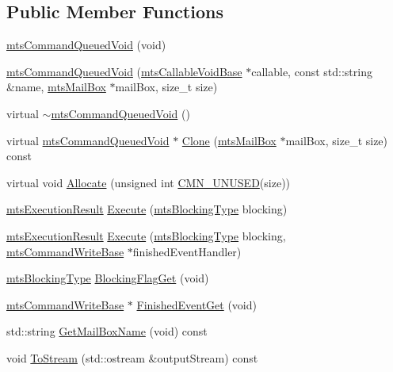 \subsection*{Public Member Functions}
\begin{DoxyCompactItemize}
\item 
\hyperlink{classmts_command_queued_void_ae4b533b50c449cae2635e9a03f311e48}{mts\+Command\+Queued\+Void} (void)
\item 
\hyperlink{classmts_command_queued_void_affae2e472d01c8042d73af7e8b625f09}{mts\+Command\+Queued\+Void} (\hyperlink{classmts_callable_void_base}{mts\+Callable\+Void\+Base} $\ast$callable, const std\+::string \&name, \hyperlink{classmts_mail_box}{mts\+Mail\+Box} $\ast$mail\+Box, size\+\_\+t size)
\item 
virtual \hyperlink{classmts_command_queued_void_ae7df3dadda5dfe5f8451df3f876e2bed}{$\sim$mts\+Command\+Queued\+Void} ()
\item 
virtual \hyperlink{classmts_command_queued_void}{mts\+Command\+Queued\+Void} $\ast$ \hyperlink{classmts_command_queued_void_ac05543187c0ece13fee129e78a3db5c3}{Clone} (\hyperlink{classmts_mail_box}{mts\+Mail\+Box} $\ast$mail\+Box, size\+\_\+t size) const 
\item 
virtual void \hyperlink{classmts_command_queued_void_a78454afe56333b6e5bb2e9c07510bc67}{Allocate} (unsigned int \hyperlink{cmn_portability_8h_a021894e2626935fa2305434b1e893ff6}{C\+M\+N\+\_\+\+U\+N\+U\+S\+E\+D}(size))
\item 
\hyperlink{classmts_execution_result}{mts\+Execution\+Result} \hyperlink{classmts_command_queued_void_ac3d3b8518799820922ccfa207ecd7ab1}{Execute} (\hyperlink{mts_forward_declarations_8h_ad7426ccb6c883bc780d0ee197dddcbe7}{mts\+Blocking\+Type} blocking)
\item 
\hyperlink{classmts_execution_result}{mts\+Execution\+Result} \hyperlink{classmts_command_queued_void_a116aafff54b04cf64c0cc5613b3af268}{Execute} (\hyperlink{mts_forward_declarations_8h_ad7426ccb6c883bc780d0ee197dddcbe7}{mts\+Blocking\+Type} blocking, \hyperlink{classmts_command_write_base}{mts\+Command\+Write\+Base} $\ast$finished\+Event\+Handler)
\item 
\hyperlink{mts_forward_declarations_8h_ad7426ccb6c883bc780d0ee197dddcbe7}{mts\+Blocking\+Type} \hyperlink{classmts_command_queued_void_a163d660aee89584416b7d30fb171a388}{Blocking\+Flag\+Get} (void)
\item 
\hyperlink{classmts_command_write_base}{mts\+Command\+Write\+Base} $\ast$ \hyperlink{classmts_command_queued_void_ae1854cdc3b5616be70f882958a0d05de}{Finished\+Event\+Get} (void)
\item 
std\+::string \hyperlink{classmts_command_queued_void_af4cee03f759bbaece836a573fb1772c2}{Get\+Mail\+Box\+Name} (void) const 
\item 
void \hyperlink{classmts_command_queued_void_ab5d265a6803f5d3c6d540bf3c4c2fd36}{To\+Stream} (std\+::ostream \&output\+Stream) const 
\end{DoxyCompactItemize}
